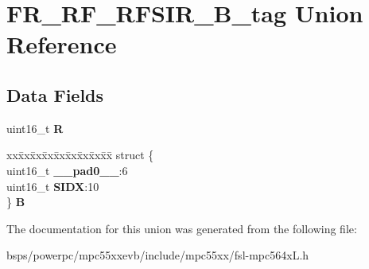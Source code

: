 \hypertarget{unionFR__RF__RFSIR__16B__tag}{}\section{F\+R\+\_\+\+R\+F\+\_\+\+R\+F\+S\+I\+R\+\_\+B\+\_\+tag Union Reference}
\label{unionFR__RF__RFSIR__16B__tag}
\subsection*{Data Fields}
\begin{DoxyCompactItemize}
\item 
\mbox{\label{unionFR__RF__RFSIR__16B__tag_aa7b0dd4a2f5b03b7bfafcf6c8cf0ec8d}} 
uint16\+\_\+t {\bfseries R}
\item 
\mbox{\label{unionFR__RF__RFSIR__16B__tag_a9a0f127291ea135323fd9cf77faf8053}} 
\begin{tabbing}
xx\=xx\=xx\=xx\=xx\=xx\=xx\=xx\=xx\=\kill
struct \{\\
\>uint16\_t {\bfseries \_\_pad0\_\_}:6\\
\>uint16\_t {\bfseries SIDX}:10\\
\} {\bfseries B}\\

\end{tabbing}\end{DoxyCompactItemize}


The documentation for this union was generated from the following file\+:\begin{DoxyCompactItemize}
\item 
bsps/powerpc/mpc55xxevb/include/mpc55xx/fsl-\/mpc564x\+L.\+h\end{DoxyCompactItemize}
